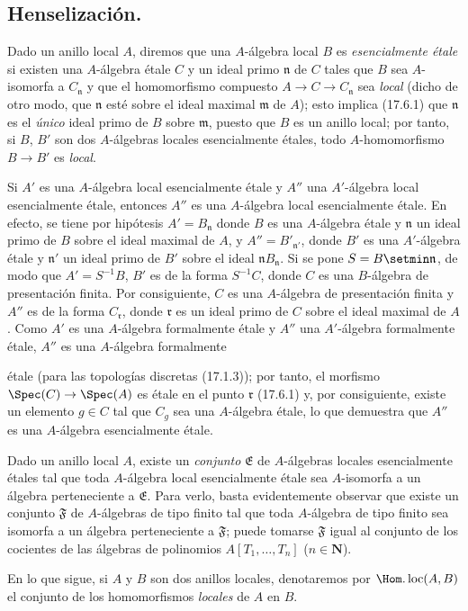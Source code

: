 \subsection{Henselización.}
\label{subsection:IV.18.6}

\begin{env}[18.6.1]
\label{IV.18.6.1}
Dado un anillo local $A$, diremos que una $A$-álgebra local $B$ es \emph{esencialmente étale} si existen una $A$-álgebra étale $C$ y un ideal primo $\mathfrak n$ de $C$ tales que $B$ sea $A$-isomorfa a $C_{\mathfrak n}$ y que el homomorfismo compuesto $A\to C\to C_{\mathfrak n}$ sea \emph{local} (dicho de otro modo, que $\mathfrak n$ esté sobre el ideal maximal $\mathfrak m$ de $A$); esto implica (17.6.1) que $\mathfrak n$ es el \emph{único} ideal primo de $B$ sobre $\mathfrak m$, puesto que $B$ es un anillo local; por tanto, si $B$, $B'$ son dos $A$-álgebras locales esencialmente étales, todo $A$-homomorfismo $B\to B'$ es \emph{local}.

Si $A'$ es una $A$-álgebra local esencialmente étale y $A''$ una $A'$-álgebra local esencialmente étale, entonces $A''$ es una $A$-álgebra local esencialmente étale. En efecto, se tiene por hipótesis $A'=B_{\mathfrak n}$ donde $B$ es una $A$-álgebra étale y $\mathfrak n$ un ideal primo de $B$ sobre el ideal maximal de $A$, y $A''=B'_{\mathfrak n'}$, donde $B'$ es una $A'$-álgebra étale y $\mathfrak n'$ un ideal primo de $B'$ sobre el ideal $\mathfrak nB_{\mathfrak n}$. Si se pone $S=B\setmin\mathfrak n$, de modo que $A'=S^{-1}B$, $B'$ es de la forma $S^{-1}C$, donde $C$ es una $B$-álgebra de presentación finita. Por consiguiente, $C$ es una $A$-álgebra de presentación finita y $A''$ es de la forma $C_{\mathfrak r}$, donde $\mathfrak r$ es un ideal primo de $C$ sobre el ideal maximal de $A$. Como $A'$ es una $A$-álgebra formalmente étale y $A''$ una $A'$-álgebra formalmente étale, $A''$ es una $A$-álgebra formalmente


étale (para las topologías discretas (17.1.3)); por tanto, el morfismo $\Spec(C)\to\Spec(A)$ es étale en el punto $\mathfrak r$ (17.6.1) y, por consiguiente, existe un elemento $g\in C$ tal que $C_g$ sea una $A$-álgebra étale, lo que demuestra que $A''$ es una $A$-álgebra esencialmente étale.

Dado un anillo local $A$, existe un \emph{conjunto} $\mathfrak E$ de $A$-álgebras locales esencialmente étales tal que toda $A$-álgebra local esencialmente étale sea $A$-isomorfa a un álgebra perteneciente a $\mathfrak E$. Para verlo, basta evidentemente observar que existe un conjunto $\mathfrak F$ de $A$-álgebras de tipo finito tal que toda $A$-álgebra de tipo finito sea isomorfa a un álgebra perteneciente a $\mathfrak F$; puede tomarse $\mathfrak F$ igual al conjunto de los cocientes de las álgebras de polinomios $A[T_1,\ldots,T_n]$ ($n\in\mathbf N$).

En lo que sigue, si $A$ y $B$ son dos anillos locales, denotaremos por $\Hom.\operatorname{loc}(A,B)$ el conjunto de los homomorfismos \emph{locales} de $A$ en $B$.
\end{env}


